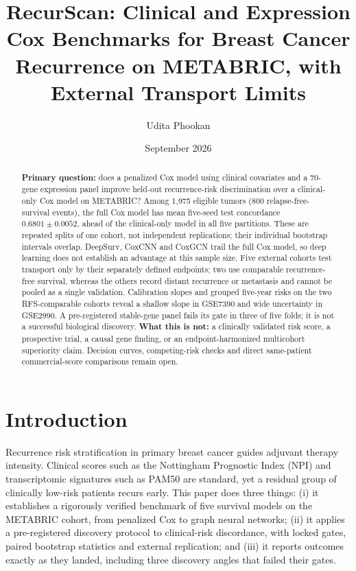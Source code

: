 \documentclass[12pt,a4paper]{article}
\title{\textbf{RecurScan: Clinical and Expression Cox Benchmarks for Breast Cancer Recurrence on METABRIC, with External Transport Limits}}
\author{Udita Phookan}
\date{September 2026}
\begin{document}
\maketitle
\begin{abstract}
\noindent \textbf{Primary question:} does a penalized Cox model using clinical
covariates and a 70-gene expression panel improve held-out recurrence-risk
discrimination over a clinical-only Cox model on METABRIC? Among 1{,}975
eligible tumors (800 relapse-free-survival events), the full Cox model has
mean five-seed test concordance $0.6801\pm0.0052$, ahead of the clinical-only
model in all five partitions. These are repeated splits of one cohort, not
independent replications; their individual bootstrap intervals overlap.
DeepSurv, CoxCNN and CoxGCN trail the full Cox model, so deep learning does
not establish an advantage at this sample size. Five external cohorts test
transport only by their separately defined endpoints; two use comparable
recurrence-free survival, whereas the others record distant recurrence or
metastasis and cannot be pooled as a single validation. Calibration slopes
and grouped five-year risks on the two RFS-comparable cohorts reveal a
shallow slope in GSE7390 and wide uncertainty in GSE2990. A pre-registered
stable-gene panel fails its gate in three of five folds; it is not a
successful biological discovery. \textbf{What this is not:} a clinically
validated risk score, a prospective trial, a causal gene finding, or an
endpoint-harmonized multicohort superiority claim. Decision curves,
competing-risk checks and direct same-patient commercial-score comparisons
remain open.
\end{abstract}
\tableofcontents
\newpage
\section{Introduction}
Recurrence risk stratification in primary breast cancer guides adjuvant
therapy intensity. Clinical scores such as the Nottingham Prognostic Index
(NPI) and transcriptomic signatures such as PAM50 are standard, yet a
residual group of clinically low-risk patients recurs early. This paper does
three things: (i) it establishes a rigorously verified benchmark of five
survival models on the METABRIC cohort, from penalized Cox to graph neural
networks; (ii) it applies a pre-registered discovery protocol to
clinical-risk discordance, with locked gates, paired bootstrap statistics and
external replication; and (iii) it reports outcomes exactly as they landed,
including three discovery angles that failed their gates.
\end{document}
